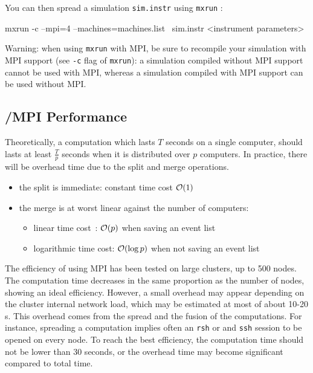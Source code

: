 You can then spread a simulation \verb'sim.instr' using \verb'mxrun' :
\begin{bash}
  mxrun -c --mpi=4 --machines=machines.list \
        sim.instr <instrument parameters>
\end{bash}

\begin{paragraph}{Warning:} when using \verb'mxrun' with MPI, be sure to
  recompile your simulation with MPI support (see \verb'-c' flag of
  \verb'mxrun'): a simulation compiled without MPI support cannot be used with
  MPI, whereas a simulation compiled with MPI support can be used without MPI.
\end{paragraph}

\subsection{\MCX/MPI Performance}

Theoretically, a computation which lasts $T$ seconds on a single computer,
should lasts at least $\frac{T}{p}$ seconds when it is distributed over $p$
computers. In practice, there will be overhead time due to the split and merge
operations.
\begin{itemize}
\item the split is immediate: constant time cost ${\cal O}(1)$
\item the merge is at worst linear against the number of computers:
  \begin{itemize}
  \item linear time cost~: ${\cal O}(p)$ when saving an event list
  \item logarithmic time cost: ${\cal O}(\log{p})$ when not saving an
  event list
  \end{itemize}
\end{itemize}

The efficiency of \MCX using MPI has been tested on large clusters, up to 500
nodes.  The computation time decreases in the same proportion as the number of
nodes, showing an ideal efficiency. However, a small overhead may appear
depending on the cluster internal network load, which may be estimated at most
of about 10-20 s.  This overhead comes from the spread and the fusion of the
computations. For instance, spreading a computation implies often an \verb'rsh'
or and \verb'ssh' session to be opened on every node.  To reach the best
efficiency, the computation time should not be lower than 30 seconds, or the
overhead time may become significant compared to total time.


